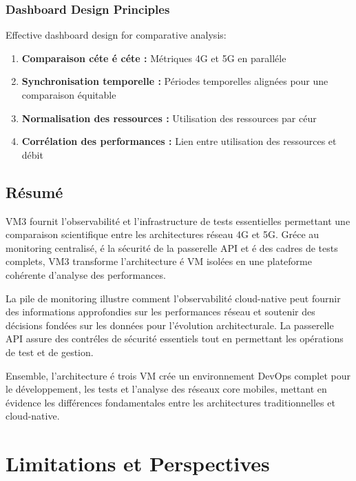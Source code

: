 \documentclass[12pt,a4paper]{report}
\begin{document}
\subsection{Dashboard Design Principles}

Effective dashboard design for comparative analysis:

\begin{enumerate}
    \item \textbf{Comparaison céte é céte :} Métriques 4G et 5G en paralléle
    \item \textbf{Synchronisation temporelle :} Périodes temporelles alignées pour une comparaison équitable
    \item \textbf{Normalisation des ressources :} Utilisation des ressources par céur
    \item \textbf{Corrélation des performances :} Lien entre utilisation des ressources et débit
\end{enumerate}

\section{Résumé}

VM3 fournit l'observabilité et l'infrastructure de tests essentielles permettant une comparaison scientifique entre les architectures réseau 4G et 5G. Gréce au monitoring centralisé, é la sécurité de la passerelle API et é des cadres de tests complets, VM3 transforme l'architecture é VM isolées en une plateforme cohérente d'analyse des performances.

La pile de monitoring illustre comment l'observabilité cloud-native peut fournir des informations approfondies sur les performances réseau et soutenir des décisions fondées sur les données pour l'évolution architecturale. La passerelle API assure des contréles de sécurité essentiels tout en permettant les opérations de test et de gestion.

Ensemble, l'architecture é trois VM crée un environnement DevOps complet pour le développement, les tests et l'analyse des réseaux core mobiles, mettant en évidence les différences fondamentales entre les architectures traditionnelles et cloud-native.

\newpage

\chapter{Limitations et Perspectives}
\end{document}
